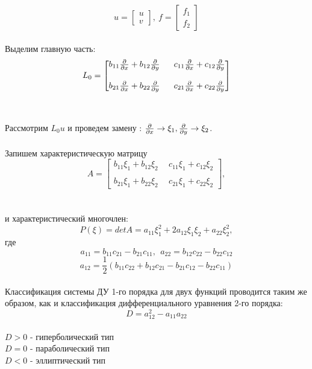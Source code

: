 \documentclass[../main.tex]{subfiles}
\begin{document}
$$u = \begin{bmatrix}
		u \\ v
	\end{bmatrix}, \  f = \begin{bmatrix}
		f_1 \\ f_2
	\end{bmatrix}$$ \\
Выделим главную часть: \\
$$
	L_0 = \begin{bmatrix}
		b_{11}\pderiv{}{x} + b_{12}\pderiv{}{y} \  & \ c_{11}\pderiv{}{x} + c_{12}\pderiv{}{y} \\ \\
		b_{21}\pderiv{}{x} + b_{22}\pderiv{}{y} \  & \ c_{21}\pderiv{}{x} + c_{22}\pderiv{}{y}
	\end{bmatrix}
$$ \\ \\
Рассмотрим $L_0u$ и проведем замену : $\frac{\partial }{\partial x} \rightarrow \xi_1, \frac{\partial }{\partial y} \rightarrow \xi_2$. \\
\\ Запишем характеристическую матрицу
$$
	A = \begin{bmatrix}
		b_{11}\xi_1 + b_{12}\xi_2 \  & \ c_{11}\xi_1 + c_{12}\xi_2 \\ \\
		b_{21}\xi_1 + b_{22}\xi_2 \  & \ c_{21}\xi_1 + c_{22}\xi_2
	\end{bmatrix},
$$ \\ \\
и характеристический многочлен:\\
$$P(\xi) = detA = a_{11}\xi_1^2 + 2a_{12}\xi_1\xi_2+a_{22}\xi_2^2,$$
где
$$a_{11} = b_{11}c_{21} - b_{21}c_{11}, \ \
	a_{22} = b_{12}c_{22} - b_{22}c_{12}$$
$$a_{12} = \frac{1}{2}(b_{11}c_{22} + b_{12}c_{21} - b_{21}c_{12} - b_{22}c_{11})$$ \\
Классификация системы ДУ 1-го порядка для двух функций проводится таким же образом, как и классификация дифференциального уравнения 2-го порядка:
\\$$D = a_{12}^2 - a_{11}a_{22} $$ \\
$D > 0$ - гиперболический тип \\
$D = 0$ - параболический тип \\
$D < 0$ - эллиптический тип \\
\\
\\
\end{document}
